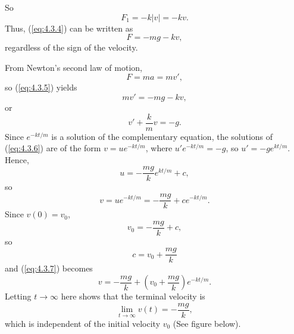 \documentclass{ximera}
\begin{document}
\begin{example}
\begin{explanation}
\begin{center}
\end{center}


 
So
$$
F_1=-k|v|=-kv.
$$
Thus, (\ref{eq:4.3.4}) can be written as
\begin{equation} \label{eq:4.3.5}
F=-mg-kv,
\end{equation}
regardless of the sign of the velocity.
 
From Newton's second law of motion,
$$
F=ma=mv',
$$
 so (\ref{eq:4.3.5}) yields
$$
mv'=-mg-kv,
$$
 or
\begin{equation} \label{eq:4.3.6}
v'+\frac{k}{m}v=-g.
\end{equation}
Since $e^{-kt/m}$ is a solution of the  complementary
equation, the solutions of (\ref{eq:4.3.6}) are of the form
$v=ue^{-kt/m}$, where $u'e^{-kt/m}=-g$, so $u'=-ge^{kt/m}$.
Hence,
$$
u=-\frac{mg}{k} e^{kt/m}+c,
$$
so
\begin{equation} \label{eq:4.3.7}
v=ue^{-kt/m}=-\frac{mg}{k}+ce^{-kt/m}.
\end{equation}
Since
 $v(0)=v_0$,
$$
v_0=-\frac{mg}{k}+c,
$$
 so
$$
c=v_0+\frac{mg}{k}
$$
 and (\ref{eq:4.3.7}) becomes
$$
v=-\frac{mg}{k}+\left(v_0+\frac{mg}{k}\right) e^{-kt/m}.
$$
Letting $t\rightarrow\infty$ here shows that the terminal velocity is
$$
\lim_{t\rightarrow\infty} v(t)=-\frac{mg}{k},
$$
which  is independent of the
initial velocity $v_0$ (See figure below).

\begin{center}
\end{center}

 
\end{explanation}
\end{example}
 
\end{document}
